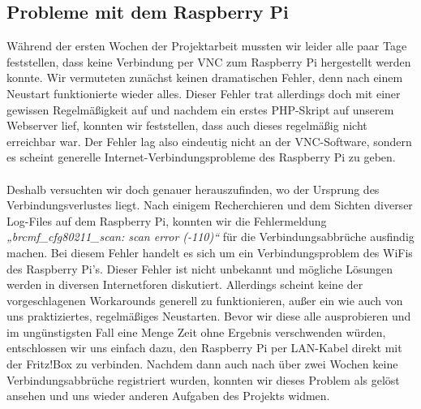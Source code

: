 \subsection{Probleme mit dem Raspberry Pi}
Während der ersten Wochen der Projektarbeit mussten wir leider alle paar Tage feststellen, dass keine Verbindung per VNC zum Raspberry Pi hergestellt werden konnte. Wir vermuteten zunächst keinen dramatischen Fehler, denn nach einem Neustart funktionierte wieder alles. Dieser Fehler trat allerdings doch mit einer gewissen Regelmäßigkeit auf und nachdem ein erstes PHP-Skript auf unserem Webserver lief, konnten wir feststellen, dass auch  dieses  regelmäßig nicht erreichbar war. Der Fehler lag also eindeutig nicht  an der VNC-Software, sondern es scheint generelle Internet-Verbindungsprobleme des Raspberry Pi zu geben.
\\
\\
Deshalb versuchten wir doch genauer herauszufinden, wo der Ursprung des Verbindungsverlustes liegt. Nach einigem Recherchieren und dem Sichten diverser Log-Files auf dem Raspberry Pi, konnten wir die Fehlermeldung \textit{„brcmf\_cfg80211\_scan: scan error (-110)“} für die Verbindungsabbrüche ausfindig machen. Bei diesem Fehler handelt es sich um ein Verbindungsproblem des WiFis des Raspberry Pi’s. Dieser Fehler ist nicht unbekannt und mögliche Lösungen werden in diversen Internetforen diskutiert. Allerdings scheint keine der vorgeschlagenen Workarounds generell zu funktionieren, außer ein wie auch von uns praktiziertes, regelmäßiges Neustarten. Bevor wir diese alle ausprobieren und im ungünstigsten Fall eine Menge Zeit ohne Ergebnis verschwenden würden, entschlossen wir uns einfach dazu, den Raspberry Pi per LAN-Kabel direkt mit der Fritz!Box zu verbinden. Nachdem dann auch nach über zwei Wochen keine Verbindungsabbrüche registriert wurden, konnten wir dieses Problem als gelöst ansehen und uns wieder anderen Aufgaben des Projekts widmen.
\\
\\
